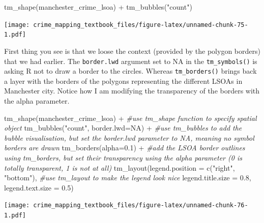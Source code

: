 \documentclass[
]{book}
\newenvironment{Shaded}{\begin{snugshade}}{\end{snugshade}}
\newcommand{\AttributeTok}[1]{\textcolor[rgb]{0.77,0.63,0.00}{#1}}
\newcommand{\CommentTok}[1]{\textcolor[rgb]{0.56,0.35,0.01}{\textit{#1}}}
\newcommand{\ConstantTok}[1]{\textcolor[rgb]{0.00,0.00,0.00}{#1}}
\newcommand{\FloatTok}[1]{\textcolor[rgb]{0.00,0.00,0.81}{#1}}
\newcommand{\FunctionTok}[1]{\textcolor[rgb]{0.00,0.00,0.00}{#1}}
\newcommand{\NormalTok}[1]{#1}
\newcommand{\SpecialCharTok}[1]{\textcolor[rgb]{0.00,0.00,0.00}{#1}}
\newcommand{\StringTok}[1]{\textcolor[rgb]{0.31,0.60,0.02}{#1}}
\begin{document}
\begin{Shaded}
\begin{Highlighting}[]
\FunctionTok{tm\_shape}\NormalTok{(manchester\_crime\_lsoa) }\SpecialCharTok{+} 
  \FunctionTok{tm\_bubbles}\NormalTok{(}\StringTok{"count"}\NormalTok{)}
\end{Highlighting}
\end{Shaded}

\texttt{[image: crime\_mapping\_textbook\_files/figure-latex/unnamed-chunk-75-1.pdf]}

First thing you see is that we loose the context (provided by the polygon borders) that we had earlier. The \texttt{border.lwd} argument set to NA in the \texttt{tm\_symbols()} is asking R not to draw a border to the circles. Whereas \texttt{tm\_borders()} brings back a layer with the borders of the polygons representing the different LSOAs in Manchester city. Notice how I am modifying the transparency of the borders with the alpha parameter.

\begin{Shaded}
\begin{Highlighting}[]
\FunctionTok{tm\_shape}\NormalTok{(manchester\_crime\_lsoa) }\SpecialCharTok{+}                         \CommentTok{\#use tm\_shape function to specify spatial object}
  \FunctionTok{tm\_bubbles}\NormalTok{(}\StringTok{"count"}\NormalTok{, }\AttributeTok{border.lwd=}\ConstantTok{NA}\NormalTok{) }\SpecialCharTok{+}              \CommentTok{\#use tm\_bubbles to add the bubble visualisation, but set the \textquotesingle{}border.lwd\textquotesingle{} parameter to NA, meaning no symbol borders are drawn}
  \FunctionTok{tm\_borders}\NormalTok{(}\AttributeTok{alpha=}\FloatTok{0.1}\NormalTok{) }\SpecialCharTok{+}                           \CommentTok{\#add the LSOA border outlines using tm\_borders, but set their transparency using the alpha parameter (0 is totally transparent, 1 is not at all)}
  \FunctionTok{tm\_layout}\NormalTok{(}\AttributeTok{legend.position =} \FunctionTok{c}\NormalTok{(}\StringTok{"right"}\NormalTok{, }\StringTok{"bottom"}\NormalTok{), }\CommentTok{\#use tm\_layout to make the legend look nice}
            \AttributeTok{legend.title.size =} \FloatTok{0.8}\NormalTok{,}
            \AttributeTok{legend.text.size =} \FloatTok{0.5}\NormalTok{)}
\end{Highlighting}
\end{Shaded}

\texttt{[image: crime\_mapping\_textbook\_files/figure-latex/unnamed-chunk-76-1.pdf]}
\end{document}
